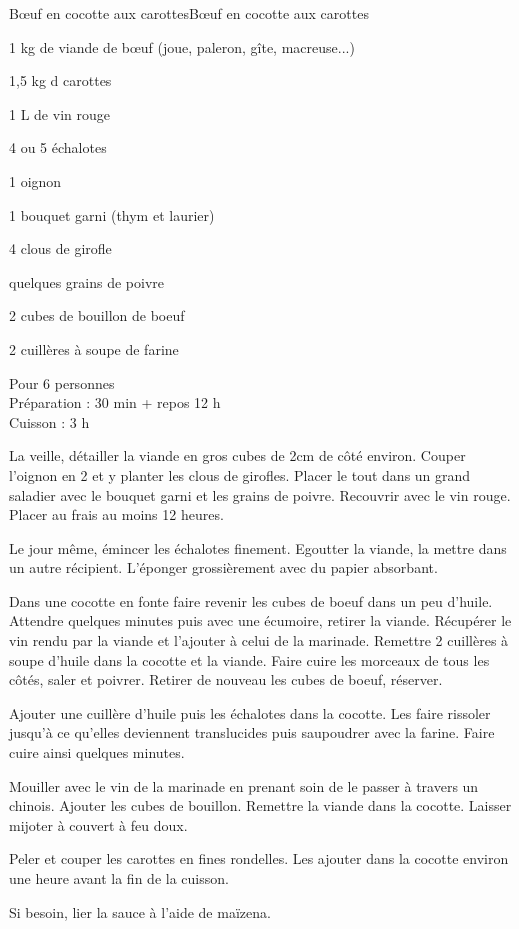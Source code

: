 \begin{recette}{Bœuf en cocotte aux carottes}{Bœuf en cocotte aux carottes}

\begin{ingredients}
1 kg de viande de bœuf (joue, paleron, gîte, macreuse...)\par
1,5 kg d carottes\par
1 L de vin rouge\par
4 ou 5 échalotes\par
1 oignon\par
1 bouquet garni (thym et laurier)\par
4 clous de girofle\par
quelques grains de poivre\par
2 cubes de bouillon de boeuf\par
2 cuillères à soupe de farine\par
\end{ingredients}

\begin{infos}
Pour 6 personnes		\\
Préparation : 30 min + repos 12 h		\\
Cuisson : 3 h			\\
\end{infos}

\begin{etapes}
\item La veille, détailler la viande en gros cubes de 2cm de côté environ. Couper l'oignon en 2 et y planter les clous de girofles. Placer le tout dans un grand saladier avec le bouquet garni et les grains de poivre. Recouvrir avec le vin rouge. Placer au frais au moins 12 heures.
\item Le jour même, émincer les échalotes finement. Egoutter la viande, la mettre dans un autre récipient. L'éponger grossièrement avec du papier absorbant.
\item Dans une cocotte en fonte faire revenir les cubes de boeuf dans un peu d'huile. Attendre quelques minutes puis avec une écumoire, retirer la viande. Récupérer le vin rendu par la viande et l'ajouter à celui de la marinade. Remettre 2 cuillères à soupe d'huile dans la cocotte et la viande. Faire cuire les morceaux de tous les côtés, saler et poivrer. Retirer de nouveau les cubes de boeuf, réserver.
\item Ajouter une cuillère d'huile puis les échalotes dans la cocotte. Les faire rissoler jusqu'à ce qu'elles deviennent translucides puis saupoudrer avec la farine. Faire cuire ainsi quelques minutes.
\item Mouiller avec le vin de la marinade en prenant soin de le passer à travers un chinois. Ajouter les cubes de bouillon. Remettre la viande dans la cocotte. Laisser mijoter à couvert à feu doux.
\item Peler et couper les carottes en fines rondelles. Les ajouter dans la cocotte environ une heure avant la fin de la cuisson.
\item Si besoin, lier la sauce à l'aide de maïzena.
\end{etapes}


\end{recette}
